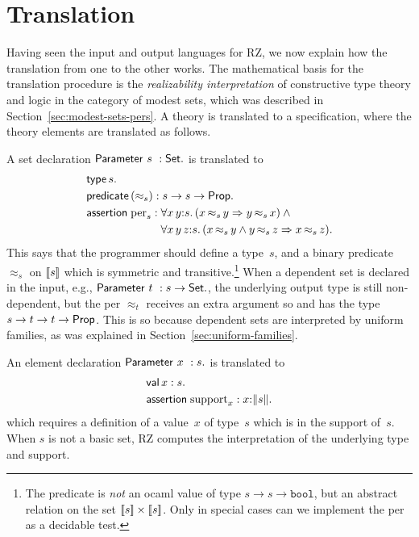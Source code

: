 
\section{Translation}
\label{sec:translation}

Having seen the input and output languages for RZ, we now explain how
the translation from one to the other works. The mathematical basis
for the translation procedure is the \emph{realizability
  interpretation} of constructive type theory and logic in the
category of modest sets, which was described in
Section~\ref{sec:modest-sets-pers}. A theory is translated to a
specification, where the theory elements are translated as follows.

A set declaration $\mathsf{Parameter}\ s\ : \mathsf{Set}.$ is translated to
%
\begin{align*}
  & \otyspec{s}. \\
  & \opropspec{({\approx_{s}})}{\oarrow{s}{\oarrow{s}{\oProp}}}.\\
  & \oassertion{\mathrm{per}_{s}}{
    \begin{aligned}[t]
      & \oforall{x\,y}{s}{(\oimply{\oper{s}{x}{y}}{\oper{s}{y}{x}})}
        \land {} \\
      & \oforall{x\,y\,z}{s}{(
        \oimply{
          \oper{s}{x}{y} \land \oper{s}{y}{z}
          }{\oper{s}{x}{z}}
        )}.
    \end{aligned}
  }
\end{align*}
%
This says that the programmer should define a type~$s$, and a binary
predicate~$\approx_s$ on $[\![s]\!]$ which is symmetric and
transitive.\footnote{The predicate is \emph{not} an ocaml value of
  type $s \to s \to \mathtt{bool}$, but an abstract relation on the
  set $[\![s]\!] \times [\![s]\!]$. Only in special cases can we
  implement the per as a decidable test.} When a dependent set is
declared in the input, e.g., $\mathsf{Parameter}\ t\ : s \to \mathsf{Set}.$, the
underlying output type is still non-dependent, but the per $\approx_t$
receives an extra argument so and has the type
$s \to t \to t \to \mathsf{Prop}$. This is so because
dependent sets are interpreted by uniform families, as was explained
in Section~\ref{sec:uniform-families}.

An element declaration $\mathsf{Parameter}\ x\ : s.$ is translated to
%
\begin{align*}
  & \mathsf{val}\,x:s. \\
  & \mathsf{assertion}\; \mathrm{support}_x : x{:}\|s\|.
\end{align*}
%
which requires a definition of a value~$x$ of type~$s$ which is in the
support of~$s$. When $s$ is not a basic set, RZ computes the
interpretation of the underlying type and support.

